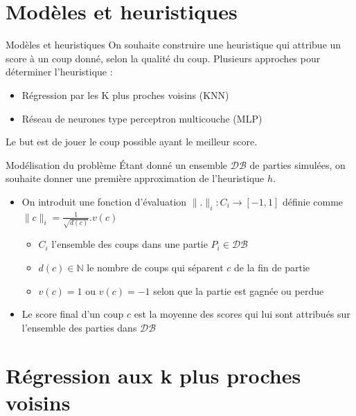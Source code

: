 \documentclass{beamer}
\begin{document}
{\section{Modèles et heuristiques}}

\begin{frame}{Modèles et heuristiques}
    On souhaite construire une heuristique qui attribue un \alert{score} à un coup donné, selon la \alert{qualité} du coup.
    Plusieurs approches pour déterminer l'heuristique :
    \begin{itemize}
        \item Régression par les K plus proches voisins (KNN)
        \item Réseau de neurones type perceptron multicouche (MLP)
    \end{itemize}
    Le but est de jouer le coup possible ayant le meilleur score.
\end{frame}

\begin{frame}{Modélisation du problème}
    Étant donné un ensemble $\mathcal{DB}$ de parties simulées,
    on souhaite donner une première approximation de l'heuristique $h$.
    \begin{itemize}
        \item On introduit une fonction d'évaluation $\lVert.\rVert_i : C_i \to [-1, 1]$
        définie comme $\lVert c \rVert_i = \frac{1}{\sqrt{d(c)}}.v(c)$
        \begin{itemize}
            \item $C_i$ l'ensemble des coups dans une partie $P_i \in \mathcal{DB}$
            \item $d(c) \in \mathbb{N}$ le nombre de coups qui séparent $c$ de la fin de partie
            \item $v(c) = 1$ ou $v(c) = -1$ selon que la partie est gagnée ou perdue
        \end{itemize}
        \item Le score final d'un coup $c$ est la moyenne des scores qui lui sont attribués sur l'ensemble des parties dans $\mathcal{DB}$
    \end{itemize}
\end{frame}

{\section{Régression aux k plus proches voisins}}
\end{document}
